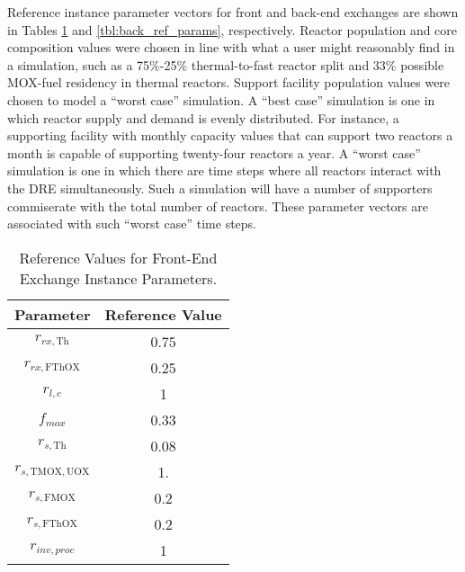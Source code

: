 Reference instance parameter vectors for front and back-end exchanges are shown
in Tables \ref{tbl:front_ref_params} and \ref{tbl:back_ref_params},
respectively. Reactor population and core composition values were chosen in line
with what a user might reasonably find in a simulation, such as a 75\%-25\%
thermal-to-fast reactor split and 33\% possible MOX-fuel residency in thermal
reactors. Support facility population values were chosen to model a ``worst
case'' simulation. A ``best case'' simulation is one in which reactor supply and
demand is evenly distributed. For instance, a supporting facility with monthly
capacity values that can support two reactors a month is capable of supporting
twenty-four reactors a year. A ``worst case'' simulation is one in which there
are time steps where all reactors interact with the DRE simultaneously. Such a
simulation will have a number of supporters commiserate with the total number of
reactors. These parameter vectors are associated with such ``worst case''
time steps.

\begin{table}[h!]
\centering
\caption{Reference Values for Front-End Exchange Instance Parameters.}
\label{tbl:front_ref_params}
\begin{tabular}{|c|c|}
\hline
Parameter    & Reference Value
\\ \hline
$r_{rx, \text{Th}}$   & 0.75 
\\ \hline
$r_{rx, \text{FThOX}}$ & 0.25
\\ \hline
$r_{l, c}$ & 1
\\ \hline
$f_{mox}$     & 0.33
\\ \hline
$r_{s, \text{Th}}$ & 0.08
\\ \hline
$r_{s, \text{TMOX}, \text{UOX}}$ & 1.
\\ \hline
$r_{s, \text{FMOX}}$ & 0.2
\\ \hline
$r_{s, \text{FThOX}}$ & 0.2
\\ \hline
$r_{inv, proc}$   & 1
\\ \hline
\end{tabular}
\end{table}

